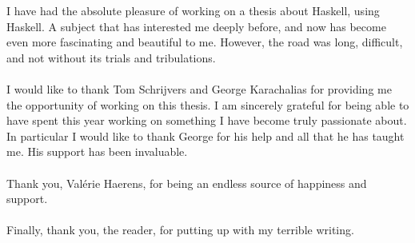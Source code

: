 I have had the absolute pleasure of working on a thesis about Haskell, using
Haskell.  A subject that has interested me deeply before, and now has become
even more fascinating and beautiful to me. However, the road was long,
difficult, and not without its trials and tribulations.
\\\\
I would like to thank Tom Schrijvers and George Karachalias for providing me the
opportunity of working on this thesis. I am sincerely grateful for being able to
have spent this year working on something I have become truly passionate about.
In particular I would like to thank George for his help and all that he has
taught me. His support has been invaluable.
\\\\
Thank you, Valérie Haerens, for being an endless source of happiness and
support.
\\\\
Finally, thank you, the reader, for putting up with my terrible writing.
